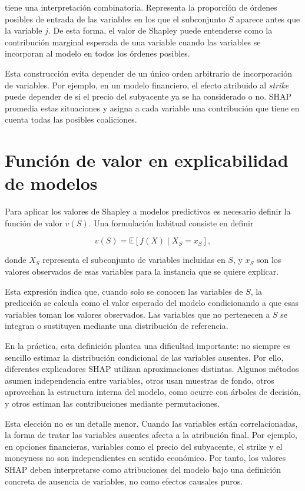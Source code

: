 tiene una interpretación combinatoria. Representa la proporción de órdenes posibles de entrada de las variables en los que el subconjunto \(S\) aparece antes que la variable \(j\). De esta forma, el valor de Shapley puede entenderse como la contribución marginal esperada de una variable cuando las variables se incorporan al modelo en todos los órdenes posibles.

Esta construcción evita depender de un único orden arbitrario de incorporación de variables. Por ejemplo, en un modelo financiero, el efecto atribuido al \emph{strike} puede depender de si el precio del subyacente ya se ha considerado o no. SHAP promedia estas situaciones y asigna a cada variable una contribución que tiene en cuenta todas las posibles coaliciones.

\section{Función de valor en explicabilidad de modelos}

Para aplicar los valores de Shapley a modelos predictivos es necesario definir la función de valor \(v(S)\). Una formulación habitual consiste en definir

\begin{equation}
v(S) =
\mathbb{E}
\left[
f(X) \mid X_S = x_S
\right],
\label{eq:shap-value-function}
\end{equation}

donde \(X_S\) representa el subconjunto de variables incluidas en \(S\), y \(x_S\) son los valores observados de esas variables para la instancia que se quiere explicar.

Esta expresión indica que, cuando solo se conocen las variables de \(S\), la predicción se calcula como el valor esperado del modelo condicionando a que esas variables toman los valores observados. Las variables que no pertenecen a \(S\) se integran o sustituyen mediante una distribución de referencia.

En la práctica, esta definición plantea una dificultad importante: no siempre es sencillo estimar la distribución condicional de las variables ausentes. Por ello, diferentes explicadores SHAP utilizan aproximaciones distintas. Algunos métodos asumen independencia entre variables, otros usan muestras de fondo, otros aprovechan la estructura interna del modelo, como ocurre con árboles de decisión, y otros estiman las contribuciones mediante permutaciones.

Esta elección no es un detalle menor. Cuando las variables están correlacionadas, la forma de tratar las variables ausentes afecta a la atribución final. Por ejemplo, en opciones financieras, variables como el precio del subyacente, el strike y el moneyness no son independientes en sentido económico. Por tanto, los valores SHAP deben interpretarse como atribuciones del modelo bajo una definición concreta de ausencia de variables, no como efectos causales puros.

